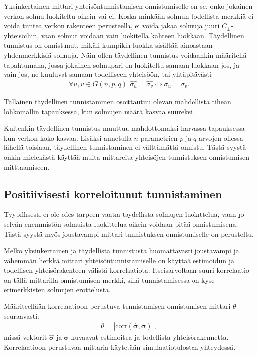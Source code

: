\documentclass[finnish,12pt,a4paper,pdftex,sci,utf8]{aaltothesis}
\begin{document}
Yksinkertainen mittari yhteisöntunnistamisen onnistumiselle on se, onko jokainen verkon solmu luokiteltu oikein vai ei. Koska minkään solmun todellista merkkiä ei voida tuntea verkon rakenteen perusteella, ei voida jakaa solmuja juuri $C_{\pm}$-yhteisöihin, vaan solmut voidaan vain luokitella kahteen luokkaan. Täydellinen tunnistus on onnistunut, mikäli kumpikin luokka sisältää ainoastaan yhdenmerkkisiä solmuja. Näin ollen täydellinen tunnistus voidaankin määritellä tapahtumana, jossa jokainen solmupari on luokiteltu samaan luokkaan jos, ja vain jos, ne kuuluvat samaan todelliseen yhteisöön, tai yhtäpitävästi
\begin{align*}
	\forall u,v \in G(n,p,q) : \hat{\sigma_u} = \hat{\sigma_v} \Leftrightarrow \sigma_u = \sigma_v.
\end{align*}

Tällainen täydellinen tunnistaminen osoittautuu olevan mahdollista tiheän lohkomallin tapauksessa, kun solmujen määrä kasvaa suureksi.

Kuitenkin täydellinen tunnistus muuttuu mahdottomaksi harvassa tapauksessa kun verkon koko kasvaa. Lisäksi annetulla $n$ parametrien $p$ ja $q$ arvojen ollessa lähellä toisiaan, täydellinen tunnistaminen ei välttämättä onnistu. Tästä syystä onkin mielekästä käyttää muita mittareita yhteisöjen tunnistuksen onnistumisen mitttaamiseen.

\subsection{Positiivisesti korreloitunut tunnistaminen}
Tyypillisesti ei ole edes tarpeen vaatia täydellistä solmujen luokittelua, vaan jo selvän enemmistön solmuista luokittelua oikein voidaan pitää onnistumisena. Tästä syystä myös joustavampi mittari tunnistuksen onnistumiselle on perusteltu.

Melko yksinkertainen ja täydellistä tunnistusta huomattavasti joustavampi ja vähemmän herkkä mittari yhteisöntunnistamiselle on käyttää estimoidun ja todellisen yhteisörakenteen välistä korrelaatiota. Itseisarvoltaan suuri korrelaatio on tällä mittarilla onnistumisen merkki, sillä tunnistamisessa on kyse erimerkkisten solmujen erottelusta.

Määriteellään korrelaatioon perustuva tunnistamisen onnistumisen mittari $\theta$ seuraavasti:
\begin{align*}
	\theta = \left| \text{corr}(\hat{\mathbf{{\sigma}}}, \mathbf{\sigma}) \right|,
\end{align*}
missä vektorit $\hat{\mathbf{\sigma}}$ ja $\mathbf{\sigma}$ kuvaavat estimoitua ja todellista yhteisörakennetta.
Korrelaatioon perustuvaa mittaria käytetään simulaatiotulosten yhteydessä.
\end{document}
